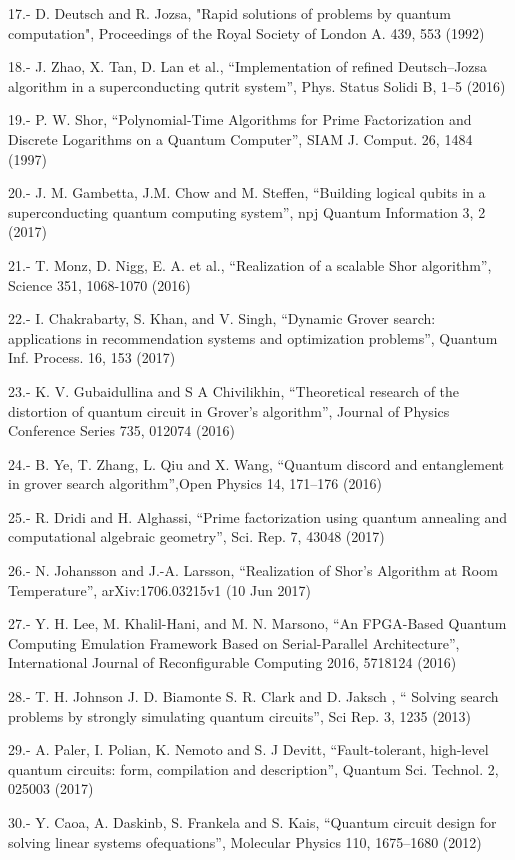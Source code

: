 17.- D. Deutsch and R. Jozsa, "Rapid solutions of problems by quantum computation", Proceedings of the Royal Society of London A. 439, 553 (1992)

18.- J. Zhao, X. Tan, D. Lan et al., “Implementation of refined Deutsch–Jozsa algorithm in a superconducting qutrit system”, Phys. Status Solidi B, 1–5 (2016)

19.- P. W. Shor, “Polynomial-Time Algorithms for Prime Factorization and Discrete Logarithms on a Quantum Computer”, SIAM J. Comput. 26, 1484 (1997)

20.- J. M. Gambetta, J.M. Chow and M. Steffen, “Building logical qubits in a superconducting quantum computing system”, npj Quantum Information 3, 2 (2017)

21.- T. Monz, D. Nigg, E. A. et al., “Realization of a scalable Shor algorithm”, Science 351, 1068-1070 (2016)

22.- I. Chakrabarty, S. Khan, and V. Singh, “Dynamic Grover search: applications in recommendation systems and optimization problems”, Quantum Inf. Process. 16, 153 (2017)

23.- K. V. Gubaidullina and S A Chivilikhin, “Theoretical research of the distortion of quantum circuit in Grover's algorithm”, Journal of Physics Conference Series 735, 012074 (2016)

24.- B. Ye, T. Zhang, L. Qiu and X. Wang, “Quantum discord and entanglement in grover search algorithm”,Open Physics 14, 171–176 (2016)

25.- R. Dridi and H. Alghassi, “Prime factorization using quantum annealing and computational algebraic geometry”, Sci. Rep. 7, 43048 (2017)

26.- N. Johansson and J.-A. Larsson, “Realization of Shor’s Algorithm at Room Temperature”, arXiv:1706.03215v1 (10 Jun 2017)

27.- Y. H. Lee, M. Khalil-Hani, and M. N. Marsono, “An FPGA-Based Quantum Computing Emulation Framework Based on Serial-Parallel Architecture”, International Journal of Reconfigurable Computing 2016, 5718124 (2016)

28.- T. H. Johnson J. D. Biamonte S. R. Clark and D. Jaksch , “ Solving search problems by strongly simulating quantum circuits”, Sci Rep. 3, 1235 (2013)

29.- A. Paler, I. Polian, K. Nemoto and S. J Devitt, “Fault-tolerant, high-level quantum circuits: form, compilation and description”, Quantum Sci. Technol. 2, 025003 (2017)


30.- Y. Caoa, A. Daskinb, S. Frankela and S. Kais, “Quantum circuit design for solving linear systems ofequations”, Molecular Physics 110, 1675–1680 (2012)

